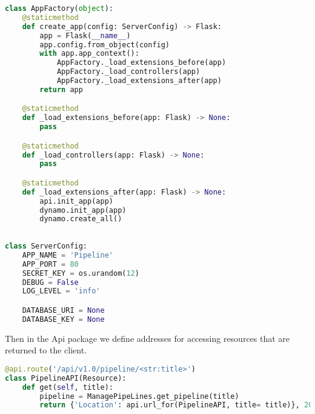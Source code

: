 \begin{lstlisting}[language=Python]
class AppFactory(object):
    @staticmethod
    def create_app(config: ServerConfig) -> Flask:
        app = Flask(__name__)
        app.config.from_object(config)
        with app.app_context():
            AppFactory._load_extensions_before(app)
            AppFactory._load_controllers(app)
            AppFactory._load_extensions_after(app)
        return app

    @staticmethod
    def _load_extensions_before(app: Flask) -> None:
        pass

    @staticmethod
    def _load_controllers(app: Flask) -> None:
        pass

    @staticmethod
    def _load_extensions_after(app: Flask) -> None:
        api.init_app(app)
        dynamo.init_app(app)
        dynamo.create_all()
        
        
class ServerConfig:
    APP_NAME = 'Pipeline'
    APP_PORT = 80
    SECRET_KEY = os.urandom(12)
    DEBUG = False
    LOG_LEVEL = 'info'

    DATABASE_URI = None
    DATABASE_KEY = None
\end{lstlisting}

Then in the Api package we define addresses for accessing resources that are returned to the client.

\begin{lstlisting}[language=Python]
@api.route('/api/v1.0/pipeline/<str:title>')
class PipelineAPI(Resource):
    def get(self, title):
        pipeline = ManagePipeLines.get_pipeline(title)
        return {'Location': api.url_for(PipelineAPI, title= title)}, 201
\end{lstlisting}